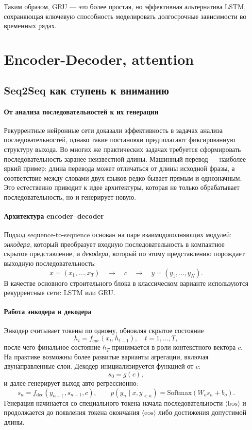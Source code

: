 \documentclass[12pt,a4paper]{article}
\begin{document}
Таким образом, GRU — это более простая, но эффективная альтернатива LSTM, сохраняющая ключевую способность моделировать долгосрочные зависимости во временных рядах.



\section{Encoder-Decoder, attention}

\subsection{Seq2Seq как ступень к вниманию}

\paragraph{От анализа последовательностей к их генерации}
Рекуррентные нейронные сети доказали эффективность в задачах анализа последовательностей, однако такие постановки предполагают фиксированную структуру выхода. Во многих же практических задачах требуется сформировать последовательность заранее неизвестной длины. Машинный перевод — наиболее яркий пример: длина перевода может отличаться от длины исходной фразы, а соответствие между словами двух языков редко бывает прямым и однозначным. Это естественно приводит к идее архитектуры, которая не только обрабатывает последовательность, но и генерирует новую.

\paragraph{Архитектура encoder--decoder}
Подход sequence-to-sequence основан на паре взаимодополняющих модулей: \textit{энкодера}, который преобразует входную последовательность в компактное скрытое представление, и \textit{декодера}, который по этому представлению порождает выходную последовательность:
\[
x=(x_1,\dots,x_T) \quad\longrightarrow\quad c \quad\longrightarrow\quad y=(y_1,\dots,y_N).
\]
В качестве основного строительного блока в классическом варианте используются рекуррентные сети: LSTM или GRU.

\paragraph{Работа энкодера и декодера}
Энкодер считывает токены по одному, обновляя скрытое состояние
\[
h_t = f_{\mathrm{enc}}(x_t, h_{t-1}),\quad t=1,\dots,T,
\]
после чего финальное состояние $h_T$ принимается в роли контекстного вектора $c$. На практике возможны более развитые варианты агрегации, включая двунаправленные слои.
Декодер инициализируется функцией от $c$:
\[
s_0 = g(c),
\]
и далее генерирует выход авто-регрессионно:
\[
s_n = f_{\mathrm{dec}}(y_{n-1}, s_{n-1}, c), \qquad
p(y_n \mid x, y_{<n}) = \mathrm{Softmax}(W_o s_n + b_o).
\]
Генерация начинается со специального токена начала последовательности $\langle \mathrm{bos} \rangle$ и продолжается до появления токена окончания $\langle \mathrm{eos} \rangle$ либо достижения допустимой длины.
\end{document}
